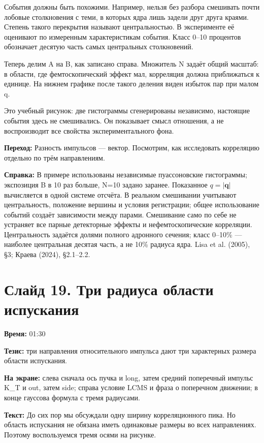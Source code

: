 \documentclass[11pt,a4paper]{article}
\begin{document}
События должны быть похожими. Например, нельзя без разбора смешивать почти лобовые столкновения с теми, в которых ядра лишь задели друг друга краями. Степень такого перекрытия называют центральностью. В эксперименте её оценивают по измеренным характеристикам события. Класс 0–10 процентов обозначает десятую часть самых центральных столкновений.

Теперь делим A на B, как записано справа. Множитель N задаёт общий масштаб: в области, где фемтоскопический эффект мал, корреляция должна приближаться к единице. На нижнем графике после такого деления виден избыток пар при малом q.

Это учебный рисунок: две гистограммы сгенерированы независимо, настоящие события здесь не смешивались. Он показывает смысл отношения, а не воспроизводит все свойства экспериментального фона.

\textbf{Переход:} Разность импульсов — вектор. Посмотрим, как исследовать корреляцию отдельно по трём направлениям.

\textbf{Справка:} В примере использованы независимые пуассоновские гистограммы; экспозиция B в 10 раз больше, N=10 задано заранее. Показанное \(q=|\mathbf q|\) вычисляется в одной системе отсчёта. В реальном смешивании учитывают центральность, положение вершины и условия регистрации; общее использование событий создаёт зависимости между парами. Смешивание само по себе не устраняет все парные детекторные эффекты и нефемтоскопические корреляции. Центральность задаётся долями полного адронного сечения; класс 0–10\% — наиболее центральная десятая часть, а не 10\% радиуса ядра. Lisa et al. (2005), §3; Краева (2024), §2.1–2.2.

\clearpage
\section*{Слайд 19. Три радиуса области испускания}
\textbf{Время:} 01:30

\textbf{Тезис:} три направления относительного импульса дают три характерных размера области испускания.

\textbf{На экране:} слева сначала ось пучка и long, затем средний поперечный импульс K\_T и out, затем side; справа условие LCMS и фраза о поперечном движении; в конце гауссова формула с тремя радиусами.

\textbf{Текст:} До сих пор мы обсуждали одну ширину корреляционного пика. Но область испускания не обязана иметь одинаковые размеры во всех направлениях. Поэтому воспользуемся тремя осями на рисунке.
\end{document}
